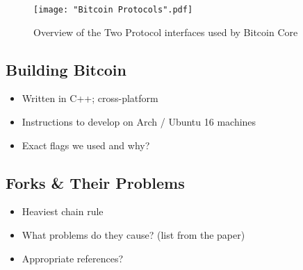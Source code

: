 \begin{figure}[!htb]
    \centering
    \texttt{[image: "Bitcoin Protocols".pdf]}
    \caption{Overview of the Two Protocol interfaces used by Bitcoin Core}
    \label{fig-btc-arch}
\end{figure}


\newpage
\subsection{Building Bitcoin} \label{btc-build}

\begin{itemize}
    \item Written in C++; cross-platform
    \item Instructions to develop on Arch / Ubuntu 16 machines
    \item Exact flags we used and why?
\end{itemize}


\newpage
\subsection{Forks \& Their Problems} \label{btc-forks}

\begin{itemize}
    \item Heaviest chain rule
    \item What problems do they cause? (list from the paper)
    \item Appropriate references?
\end{itemize}
